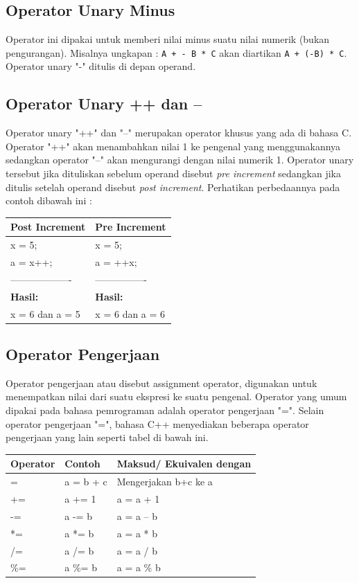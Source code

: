 \subsection{Operator Unary Minus}\label{b-operator-unary-minus}

Operator ini dipakai untuk memberi nilai minus suatu nilai numerik
(bukan pengurangan). Misalnya ungkapan : \texttt{A\ +\ -\ B\ *\ C} akan
diartikan \texttt{A\ +\ (-B)\ *\ C}. Operator unary "-" ditulis di
depan operand.

\subsection{Operator Unary ++ dan --}\label{c-operator-unary-dan}

Operator unary "++" dan "--" merupakan operator khusus yang ada di
bahasa C. Operator "++" akan menambahkan nilai 1 ke pengenal yang
menggunakannya sedangkan operator "--" akan mengurangi dengan nilai
numerik 1. Operator unary tersebut jika dituliskan sebelum operand
disebut \emph{pre increment} sedangkan jika ditulis setelah operand
disebut \emph{post increment}. Perhatikan perbedaannya pada contoh
dibawah ini :

\begin{longtable}[]{@{}ll@{}}
\toprule
Post Increment & Pre Increment\tabularnewline
\midrule
\endhead
x = 5; & x = 5;\tabularnewline
a = x++; & a = ++x;\tabularnewline
------------------- & ----------------\tabularnewline
\textbf{Hasil:} & \textbf{Hasil:}\tabularnewline
x = 6 dan a = 5 & x = 6 dan a = 6\tabularnewline
\bottomrule
\end{longtable}

\subsection{Operator Pengerjaan}\label{d-operator-pengerjaan}

Operator pengerjaan atau disebut assignment operator, digunakan untuk
menempatkan nilai dari suatu ekspresi ke suatu pengenal. Operator yang
umum dipakai pada bahasa pemrograman adalah operator pengerjaan "=".
Selain operator pengerjaan "=", bahasa C++ menyediakan beberapa
operator pengerjaan yang lain seperti tabel di bawah ini.

\begin{longtable}[]{@{}lll@{}}
\toprule
Operator & Contoh & Maksud/ Ekuivalen dengan\tabularnewline
\midrule
\endhead
= & a = b + c & Mengerjakan b+c ke a\tabularnewline
+= & a += 1 & a = a + 1\tabularnewline
-= & a -= b & a = a -- b\tabularnewline
*= & a *= b & a = a * b\tabularnewline
/= & a /= b & a = a / b\tabularnewline
\%= & a \%= b & a = a \% b\tabularnewline
\bottomrule
\end{longtable}

